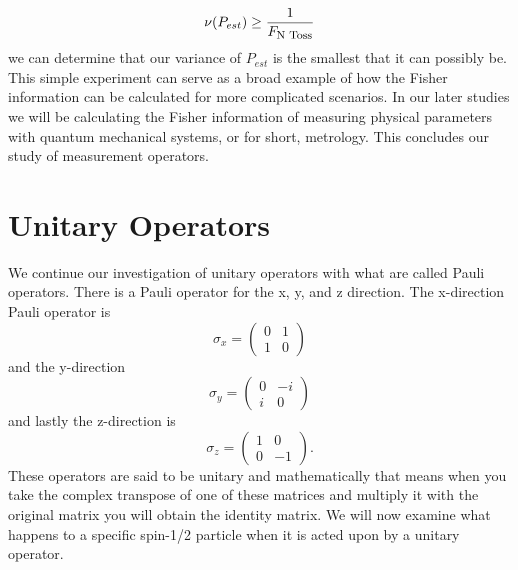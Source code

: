 \documentclass[twocolumn]{article}
\begin{document}
\begin{equation}
\nu(P_{est})\geq\frac{1}{F_{\text{\footnotesize{N Toss}}}}
\end{equation}
we can determine that our variance of $P_{est}$ is the smallest that it can possibly be. This simple experiment can serve as a broad example of how the Fisher information can be calculated for more complicated scenarios. In our later studies we will be calculating the Fisher information of measuring physical parameters with quantum mechanical systems, or for short, metrology. This concludes our study of measurement operators.
\section*{Unitary Operators}
We continue our investigation of unitary operators with what are called Pauli operators. There is a Pauli operator for the x, y, and z direction. The x-direction Pauli operator is
\begin{equation}
\sigma_x=
\begin{pmatrix}
0 & 1 \\
1 & 0
\end{pmatrix}
\end{equation}
and the y-direction
\begin{equation}
\sigma_y=
\begin{pmatrix}
0 & -i \\
i & 0
\end{pmatrix}
\end{equation}
and lastly the z-direction is
\begin{equation}
\sigma_z=
\begin{pmatrix}
1 & 0 \\
0 & -1
\end{pmatrix}.
\end{equation}
These operators are said to be unitary and mathematically that means when you take the complex transpose of one of these matrices and multiply it with the original matrix you will obtain the identity matrix. We will now examine what happens to a specific spin-1/2 particle when it is acted upon by a unitary operator.
\end{document}
